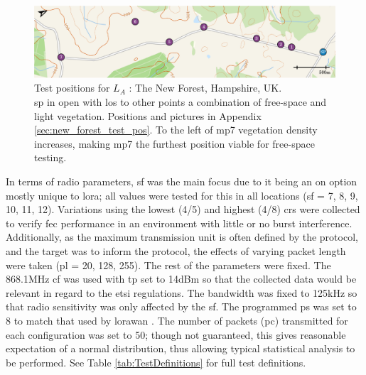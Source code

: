   \begin{figure}[H]
    \centering
    \includegraphics[width=\textwidth]{Figures/new_forest_light.pdf}
    \caption[Test Location: The New Forest, Hampshire, UK]{
    Test positions for \textbf{$L_A$} :  The New Forest, Hampshire, UK.\protect\footnotemark[1] \\
    \ac{sp} in open with \ac{los} to other points a combination of free-space and light vegetation. Positions and pictures in Appendix \ref{sec:new_forest_test_pos}. To the left of \ac{mp}7 vegetation density increases,  making \ac{mp}7 the furthest position viable for free-space testing.
    }
    \label{fig:new_forest_map}
\end{figure}

 In terms of radio parameters, \ac{sf} was the main focus due to it being an on option mostly unique to \ac{lora}; all values were tested for this in all locations (\ac{sf} = 7, 8, 9, 10, 11, 12). Variations using the lowest (4/5) and highest (4/8) \ac{cr}s were collected to verify \ac{fec} performance in an environment with little or no burst interference. Additionally, as the maximum transmission unit is often defined by the protocol, and the target was to inform the protocol, the effects of varying packet length were taken (\ac{pl} = 20, 128, 255). The rest of the parameters were fixed. The 868.1MHz \ac{cf} was used with \ac{tp} set to 14dBm so that the collected data would be relevant in regard to the \ac{etsi} regulations. The bandwidth was fixed to 125kHz so that radio sensitivity was only affected by the \ac{sf}. The programmed \ac{ps} was set to 8 to match that used by \ac{lorawan} \cite{3YP:LORAWAN_REGIONAL_PARAMS}. The number of packets (\ac{pc}) transmitted for each configuration was set to 50; though not guaranteed, this gives reasonable expectation of a normal distribution, thus allowing typical statistical analysis to be performed. See Table \ref{tab:TestDefinitions} for full test definitions.
 
